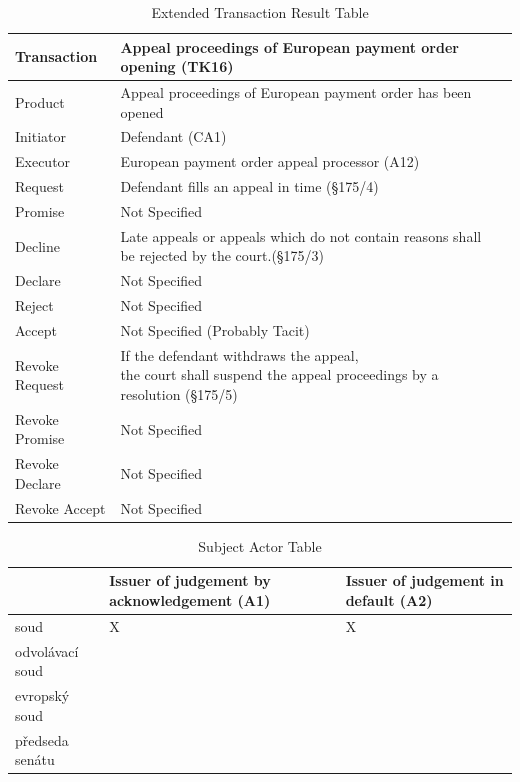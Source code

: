 \begin{landscape}
\begin{table}[h]
\caption{Extended Transaction Result Table}
\label{tab:etrt}
\begin{tabular}{|l||l|l|}
\hline
Transaction  &   Appeal proceedings of European payment order opening (TK16) \\ \hline
Product      &  Appeal proceedings of European payment order has been opened \\ \hline
Initiator      &  Defendant (CA1)\\ \hline
Executor       &  European payment order appeal processor (A12) \\ \hline
Request        &   Defendant fills an appeal in time (\S175/4) \\ \hline
Promise        &    Not Specified   \\ \hline
Decline        &  Late appeals or appeals which do not contain reasons shall be rejected by the court.(\S175/3)  \\ \hline
Declare        &  Not Specified  \\ \hline
Reject         &  Not Specified   \\ \hline
Accept         & Not Specified (Probably Tacit) \\ \hline
Revoke Request & \makecell{If the defendant withdraws the appeal,\\ the court shall suspend the appeal proceedings by a resolution (\S175/5)}      \\ \hline
Revoke Promise & Not Specified  \\ \hline
Revoke Declare & Not Specified      \\ \hline
Revoke Accept  &  Not Specified \\ \hline
\end{tabular}
\end{table}


\begin{table}[h]
\caption{Subject Actor Table}
\label{tab:subjectactortable}
\begin{tabular}{|l|l|l|}
\hline
  & Issuer of judgement by acknowledgement (A1)  &  Issuer of judgement in default (A2)   \\ \hline
soud & X & X  \\ \hline
odvolávací soud &  &  \\ \hline
evropský soud &  &  \\ \hline
předseda senátu &  &  \\ \hline
\end{tabular}
\end{table}


\end{landscape}
